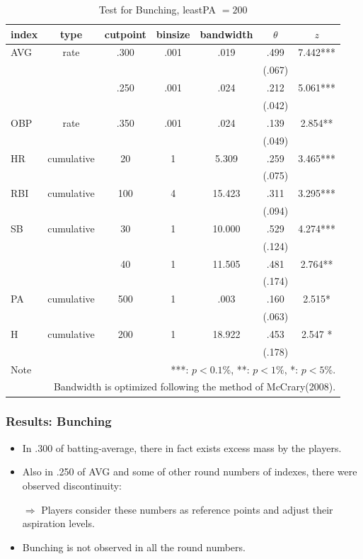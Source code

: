 \documentclass[dvipdfmx,12pt]{beamer}
\begin{document}
\begin{frame}
  \begin{table}
    \tiny
    \centering
    \caption{Test for Bunching, leastPA $= 200$}
    \begin{tabular}{lcccccc}\hline
      index & type & cutpoint & binsize & bandwidth & $\theta$ & $z$
      \\ \hline \hline
      AVG & rate & .300 & .001 & .019 &  .499 & 7.442*** \\
      & & & & & (.067) & \\
      & & .250 & .001 & .024 & .212 & 5.061*** \\
      & & & & & (.042) & \\
      OBP & rate & .350 & .001 & .024 &  .139 & 2.854** \\
      & & & & & (.049) &  \\
      HR & cumulative & 20 & 1 & 5.309 & .259 & 3.465*** \\
      & & & & & (.075)  & \\
      RBI & cumulative & 100 & 4 & 15.423 & .311 & 3.295*** \\
      & & & & & (.094) & \\
      SB & cumulative & 30 & 1 & 10.000 & .529 & 4.274*** \\
      & & & & & (.124) & \\
      & & 40 & 1 & 11.505 & .481 & 2.764** \\
      & & & & & (.174) & \\
      PA & cumulative & 500 & 1 & .003 & .160 & 2.515* \\
      & & & & &(.063) & \\
      H & cumulative & 200 & 1 & 18.922 & .453 & 2.547 * \\
      & & & & & (.178) & \\ \hline \hline
      Note & \multicolumn{6}{r}{
      ***: $p<0.1\%$, **: $p<1\%$, *: $p<5\%$.
      }\\
      \multicolumn{7}{r}{
      Bandwidth is optimized following the method of McCrary(2008).
      }
    \end{tabular}
    \label{Bunch-True}
  \end{table}
\end{frame}

\begin{frame}\frametitle{Results: Bunching}
  \begin{itemize}
    \item In .300 of batting-average, there in fact exists excess mass by the players.

    \item Also in .250 of AVG and some of other round numbers of indexes, there were observed discontinuity:

    $\Rightarrow$ Players consider these numbers as reference points and adjust their aspiration levels.

    \item Bunching is not observed in all the round numbers.

  \end{itemize}
\end{frame}
\end{document}
